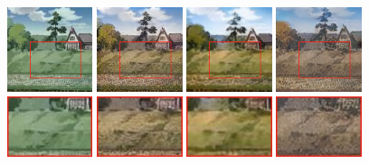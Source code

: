\documentclass[runningheads]{llncs}
\begin{document}
\begin{figure}[!htb]
\subfigure
{\includegraphics[width=25mm]{zooming_picture/in_sx.jpg}}
\subfigure
{\includegraphics[width=25mm]{zooming_picture/our_sx.jpg}}
\subfigure
{\includegraphics[width=25mm]{zooming_picture/unit_sx.jpg}}
\subfigure
{\includegraphics[width=25mm]{zooming_picture/sgan_sx.jpg}}
\subfigure
{\includegraphics[width=25mm]{zooming_picture/in_sy.jpg}}
\subfigure
{\includegraphics[width=25mm]{zooming_picture/our_sy.jpg}}
\subfigure
{\includegraphics[width=25mm]{zooming_picture/unit_sy.jpg}}
\subfigure
{\includegraphics[width=25mm]{zooming_picture/sgan_sy.jpg}}

\end{figure}
\end{document}
